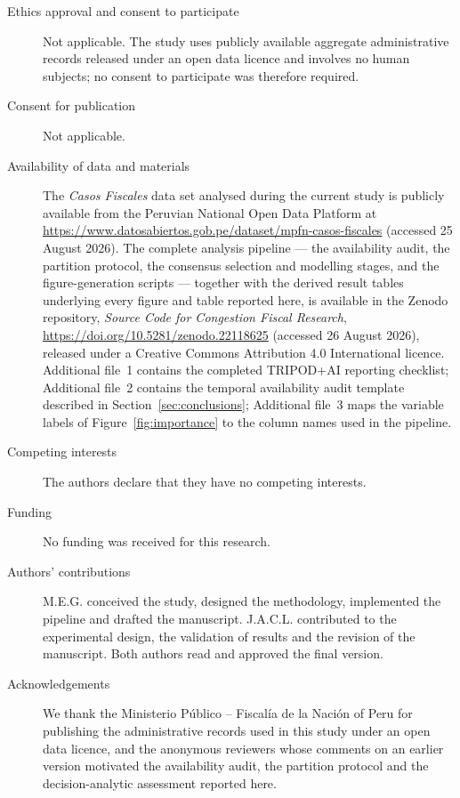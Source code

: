 \documentclass[sn-vancouver,Numbered]{sn-jnl}
\begin{document}
\begin{description}
\item[Ethics approval and consent to participate] Not applicable. The study uses publicly available aggregate administrative records released under an open data licence and involves no human subjects; no consent to participate was therefore required.
\item[Consent for publication] Not applicable.
\item[Availability of data and materials] The \emph{Casos Fiscales} data set analysed during the current study is publicly available from the Peruvian National Open Data Platform at \url{https://www.datosabiertos.gob.pe/dataset/mpfn-casos-fiscales} (accessed 25 August 2026). The complete analysis pipeline --- the availability audit, the partition protocol, the consensus selection and modelling stages, and the figure-generation scripts --- together with the derived result tables underlying every figure and table reported here, is available in the Zenodo repository, \emph{Source Code for Congestion Fiscal Research}, \url{https://doi.org/10.5281/zenodo.22118625} (accessed 26 August 2026), released under a Creative Commons Attribution 4.0 International licence. Additional file~1 contains the completed TRIPOD+AI reporting checklist; Additional file~2 contains the temporal availability audit template described in Section~\ref{sec:conclusions}; Additional file~3 maps the variable labels of Figure~\ref{fig:importance} to the column names used in the pipeline.
\item[Competing interests] The authors declare that they have no competing interests.
\item[Funding] No funding was received for this research.
\item[Authors' contributions] M.E.G. conceived the study, designed the methodology, implemented the pipeline and drafted the manuscript. J.A.C.L. contributed to the experimental design, the validation of results and the revision of the manuscript. Both authors read and approved the final version.
\item[Acknowledgements] We thank the Ministerio P\'ublico -- Fiscal\'ia de la Naci\'on of Peru for publishing the administrative records used in this study under an open data licence, and the anonymous reviewers whose comments on an earlier version motivated the availability audit, the partition protocol and the decision-analytic assessment reported here.
\end{description}


\end{document}
